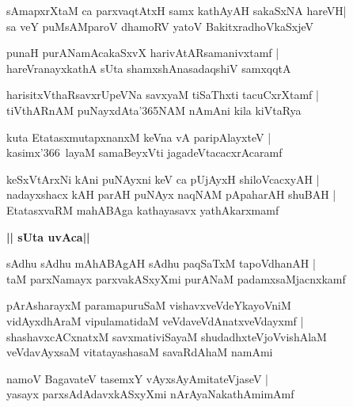 \documentclass[twoside,12pt,openright]{book}
\newcounter{shloka}[chapter]
\def\uvaca#1{\centerline{{\large\textbf{#1}}}}
\begin{document}
\begin{shloka}
sAmapxrXtaM ca parxvaqtAtxH samx kathAyAH sakaSxNA hareVH|\\
sa veY puMsAMparoV dhamoRV yatoV BakitxradhoVkaSxjeV
\end{shloka}


\begin{shloka}
punaH purANamAcakaSxvX harivAtARsamanivxtamf |\\
hareVranayxkathA sUta shamxshAnasadaqshiV samxqqtA 
\end{shloka}

\begin{shloka}
harisitxVthaRsavxrUpeVNa savxyaM tiSaThxti tacuCxrXtamf |\\
tiVthARnAM puNayxdAta\char'365NAM nAmAni kila kiVtaRya 
\end{shloka}

\begin{shloka}
kuta EtatasxmutapxnanxM keVna vA paripAlayxteV |\\
kasimx\char'366\ layaM samaBeyxVti jagadeVtacacxrAcaramf 
\end{shloka}

\begin{shloka}
keSxVtArxNi kAni puNAyxni keV ca pUjAyxH shiloVcacxyAH |\\
nadayxshacx kAH parAH puNAyx naqNAM pApaharAH shuBAH |\\
EtatasxvaRM mahABAga kathayasavx yathAkarxmamf 
\end{shloka}


\uvaca{|| sUta uvAca||}

\begin{shloka}
sAdhu sAdhu mAhABAgAH sAdhu paqSaTxM tapoVdhanAH |\\
taM parxNamayx parxvakASxyXmi purANaM padamxsaMjacnxkamf
\end{shloka}

\begin{shloka}
pArAsharayxM paramapuruSaM vishavxveVdeYkayoVniM \\
vidAyxdhAraM vipulamatidaM veVdaveVdAnatxveVdayxmf |\\
shashavxcACxnatxM savxmativiSayaM shudadhxteVjoVvishAlaM \\
veVdavAyxsaM vitatayashasaM savaRdAhaM namAmi
\end{shloka}

\begin{shloka}
namoV BagavateV tasemxY vAyxsAyAmitateVjaseV |\\
yasayx parxsAdAdavxkASxyXmi nArAyaNakathAmimAmf 
\end{shloka}
\end{document}
